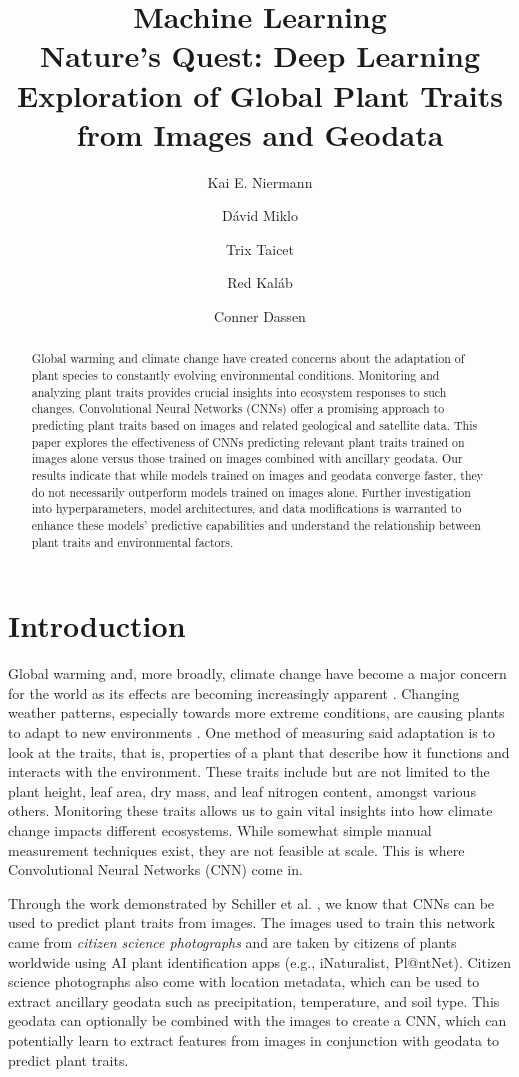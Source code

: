 \documentclass[12pt,a4paper,oneside]{article}
\title{
    \Huge{Machine Learning} \\ \LARGE 
    Nature's Quest: Deep Learning Exploration of Global Plant Traits from Images and Geodata
}
\author{
Kai E. Niermann \and
Dávid Miklo \and 
Trix Taicet \and
Red Kaláb \and
Conner Dassen
}
\date{\DTMusedate{date}}
\begin{document}
\maketitle

% 

\begin{abstract}
    Global warming and climate change have created concerns about the adaptation of plant species to constantly evolving environmental conditions. Monitoring and analyzing plant traits provides crucial insights into ecosystem responses to such changes. Convolutional Neural Networks (CNNs) offer a promising approach to predicting plant traits based on images and related geological and satellite data. This paper explores the effectiveness of CNNs predicting relevant plant traits trained on images alone versus those trained on images combined with ancillary geodata. Our results indicate that while models trained on images and geodata converge faster, they do not necessarily outperform models trained on images alone. Further investigation into hyperparameters, model architectures, and data modifications is warranted to enhance these models' predictive capabilities and understand the relationship between plant traits and environmental factors.    
\end{abstract}

\section{Introduction}
Global warming and, more broadly, climate change have become a major concern for the world as its effects are becoming increasingly apparent \cite{WANG2023100237}. Changing weather patterns, especially towards more extreme conditions, are causing plants to adapt to new environments \cite{GRAY201664}. One method of measuring said adaptation is to look at the traits, that is, properties of a plant that describe how it functions and interacts with the environment. These traits include but are not limited to the plant height, leaf area, dry mass, and leaf nitrogen content, amongst various others. Monitoring these traits allows us to gain vital insights into how climate change impacts different ecosystems. While somewhat simple manual measurement techniques exist, they are not feasible at scale. This is where Convolutional Neural Networks (CNN) come in.  

\smallskip
Through the work demonstrated by Schiller et al. \cite{schiller2021deep}, we know that CNNs can be used to predict plant traits from images. The images used to train this network came from \textit{citizen science photographs} and are taken by citizens of plants worldwide using AI plant identification apps (e.g., iNaturalist, Pl@ntNet). Citizen science photographs also come with location metadata, which can be used to extract ancillary geodata such as precipitation, temperature, and soil type. This geodata can optionally be combined with the images to create a CNN, which can potentially learn to extract features from images in conjunction with geodata to predict plant traits.
\end{document}
